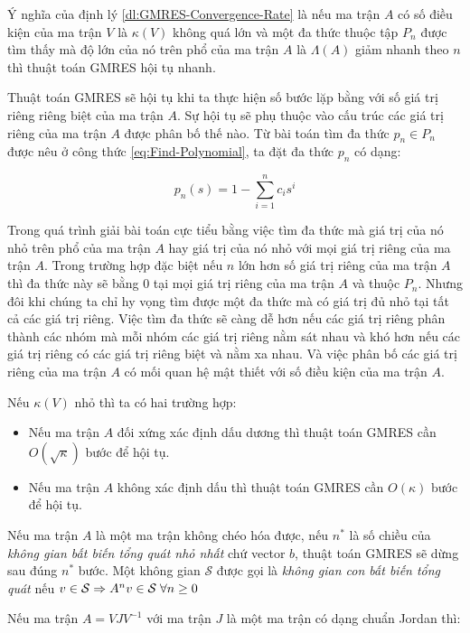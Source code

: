 \documentclass[14pt, a4paper]{article}
\numberwithin{equation}{section}
\numberwithin{algorithm}{section}
\numberwithin{figure}{section}
\numberwithin{dl}{section}
\numberwithin{md}{section}
\numberwithin{bd}{section}
\numberwithin{dn}{section}
\begin{document}
Ý nghĩa của định lý \ref{dl:GMRES-Convergence-Rate} là nếu ma trận $A$ có số điều kiện của ma trận $V$ là $\kappa(V)$ không quá lớn và một đa thức thuộc tập $P_n$ được tìm thấy mà độ lớn của nó trên phổ của ma trận $A$ là $\Lambda(A)$ giảm nhanh theo $n$ thì thuật toán GMRES hội tụ nhanh.

Thuật toán GMRES sẽ hội tụ khi ta thực hiện số bước lặp bằng với số giá trị riêng riêng biệt của ma trận $A$. Sự hội tụ sẽ phụ thuộc vào cấu trúc các giá trị riêng của ma trận $A$ được phân bố thế nào.
Từ bài toán tìm đa thức $p_n \in P_n$ được nêu ở công thức \ref{eq:Find-Polynomial}, ta đặt đa thức $p_n$ có dạng:

\begin{equation}
    p_n(s) = 1 - \sum_{i=1}^n c_i s^i
\end{equation}

Trong quá trình giải bài toán cực tiểu bằng việc tìm đa thức mà giá trị của nó nhỏ trên phổ của ma trận $A$ hay giá trị của nó nhỏ với mọi giá trị riêng của ma trận $A$. Trong trường hợp đặc biệt nếu $n$ lớn hơn số giá trị riêng của ma trận $A$ thì đa thức này sẽ bằng 0 tại mọi giá trị riêng của ma trận $A$ và thuộc $P_n$.
Nhưng đôi khi chúng ta chỉ hy vọng tìm được một đa thức mà có giá trị đủ nhỏ tại tất cả các giá trị riêng. Việc tìm đa thức sẽ càng dễ hơn nếu các giá trị riêng phân thành các nhóm mà mỗi nhóm các giá trị riêng nằm sát nhau và khó hơn nếu các giá trị riêng có các giá trị riêng biệt và nằm xa nhau. Và việc phân bố các giá trị riêng của ma trận $A$ có mối quan hệ mật thiết với số điều kiện của ma trận $A$.

Nếu $\kappa(V)$ nhỏ thì ta có hai trường hợp:
\begin{itemize}
    \item Nếu ma trận $A$ đối xứng xác định dấu dương thì thuật toán GMRES cần $O(\sqrt{\kappa})$ bước để hội tụ.
    \item Nếu ma trận $A$ không xác định dấu thì thuật toán GMRES cần $O(\kappa)$ bước để hội tụ.
\end{itemize}

Nếu ma trận $A$ là một ma trận không chéo hóa được, nếu $n^{*}$ là số chiều của \textit{không gian bất biến tổng quát nhỏ nhất} chứ vector $b$, thuật toán GMRES sẽ dừng sau đúng $n^{*}$ bước. Một không gian $\mathcal{S}$ được gọi là \textit{không gian con bất biến tổng quát} nếu $v \in \mathcal{S} \Rightarrow A^{n}v \in \mathcal{S} \thickspace \forall n \geq 0$ 

Nếu ma trận $A=VJV^{-1}$ với ma trận $J$ là một ma trận có dạng chuẩn Jordan thì:
\end{document}
